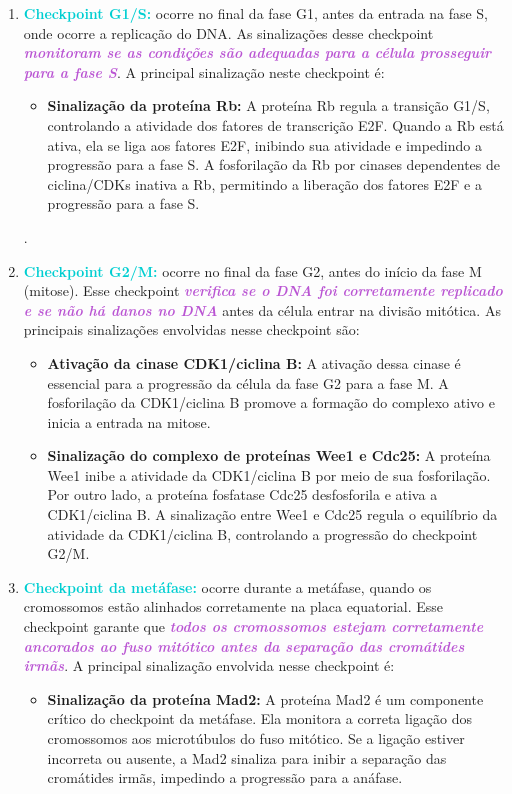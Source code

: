 \documentclass[11pt,a4paper]{article}
\begin{document}
	\begin{enumerate}
		\item \textcolor{DarkTurquoise}{\textbf{Checkpoint G1/S:}} ocorre no final da fase G1, antes da entrada na fase S, onde ocorre a replicação do DNA. As sinalizações desse checkpoint \textcolor{MediumOrchid}{\textbf{\textit{monitoram se as condições são adequadas para a célula prosseguir para a fase S}}}. A principal sinalização neste checkpoint é:
			\begin{itemize}
				\item \textbf{Sinalização da proteína Rb:} A proteína Rb regula a transição G1/S, controlando a atividade dos fatores de transcrição E2F. Quando a Rb está ativa, ela se liga aos fatores E2F, inibindo sua atividade e impedindo a progressão para a fase S. A fosforilação da Rb por cinases dependentes de ciclina/CDKs inativa a Rb, permitindo a liberação dos fatores E2F e a progressão para a fase S.
			\end{itemize}.
		\item \textcolor{DarkTurquoise}{\textbf{Checkpoint G2/M:}} ocorre no final da fase G2, antes do início da fase M (mitose). Esse checkpoint \textcolor{MediumOrchid}{\textbf{\textit{verifica se o DNA foi corretamente replicado e se não há danos no DNA}}} antes da célula entrar na divisão mitótica. As principais sinalizações envolvidas nesse checkpoint são:
			\begin{itemize}[label=\textcolor{CarnationPink}{$\star$}]
				\item \textbf{Ativação da cinase CDK1/ciclina B:} A ativação dessa cinase é essencial para a progressão da célula da fase G2 para a fase M. A fosforilação da CDK1/ciclina B promove a formação do complexo ativo e inicia a entrada na mitose.
				\item \textbf{Sinalização do complexo de proteínas Wee1 e Cdc25:} A proteína Wee1 inibe a atividade da CDK1/ciclina B por meio de sua fosforilação. Por outro lado, a proteína fosfatase Cdc25 desfosforila e ativa a CDK1/ciclina B. A sinalização entre Wee1 e Cdc25 regula o equilíbrio da atividade da CDK1/ciclina B, controlando a progressão do checkpoint G2/M.
			\end{itemize}
		\item \textcolor{DarkTurquoise}{\textbf{Checkpoint da metáfase:}} ocorre durante a metáfase, quando os cromossomos estão alinhados corretamente na placa equatorial. Esse checkpoint garante que \textcolor{MediumOrchid}{\textbf{\textit{todos os cromossomos estejam corretamente ancorados ao fuso mitótico antes da separação das cromátides irmãs}}}. A principal sinalização envolvida nesse checkpoint é:
			\begin{itemize}[label=\textcolor{CarnationPink}{$\star$}]
				\item \textbf{Sinalização da proteína Mad2:} A proteína Mad2 é um componente crítico do checkpoint da metáfase. Ela monitora a correta ligação dos cromossomos aos microtúbulos do fuso mitótico. Se a ligação estiver incorreta ou ausente, a Mad2 sinaliza para inibir a separação das cromátides irmãs, impedindo a progressão para a anáfase.
			\end{itemize}
	\end{enumerate}
\end{document}
